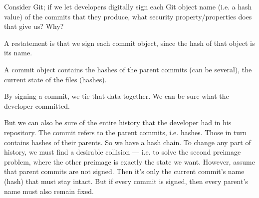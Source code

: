 \begin{exercise}
  Consider Git; if we let developers digitally sign each Git object name (i.e. 
  a hash value) of the commits that they produce, what security 
  property/properties does that give us? Why?
\end{exercise}
\begin{solution}
  A restatement is that we sign each commit object, since the hash of that 
  object is its name.

  A commit object contains the hashes of the parent commits (can be several), 
  the current state of the files (hashes).

  By signing a commit, we tie that data together. We can be sure what the 
  developer committed.

  But we can also be sure of the entire history that the developer had in his 
  repository. The commit refers to the parent commits, i.e. hashes. Those in 
  turn contains hashes of their parents. So we have a hash chain. To change any 
  part of history, we must find a desirable collision --- i.e. to solve the 
  second preimage problem, where the other preimage is exactly the state we 
  want. However, assume that parent commits are not signed. Then it's only the 
  current commit's name (hash) that must stay intact. But if every commit is 
  signed, then every parent's name must also remain fixed.
\end{solution}
